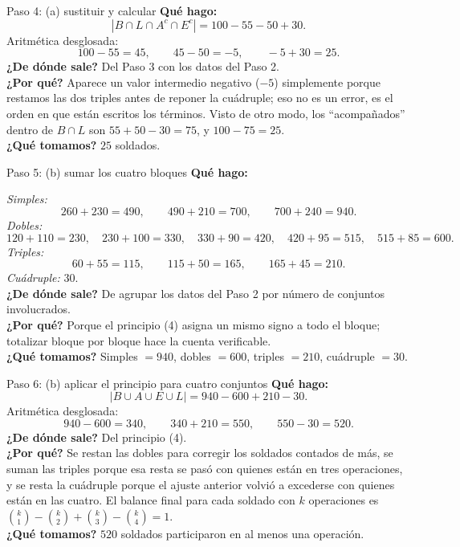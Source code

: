 \documentclass[11pt]{article}
\begin{document}
\begin{sol}
\begin{paso}{Paso 4: (a) sustituir y calcular}
\textbf{Qu\'e hago:}
\[
|B\cap L\cap A^{c}\cap E^{c}| = 100 - 55 - 50 + 30 .
\]
Aritm\'etica desglosada:
\[
100 - 55 = 45,\qquad 45 - 50 = -5,\qquad -5 + 30 = 25 .
\]
\textbf{¿De d\'onde sale?} Del Paso 3 con los datos del Paso 2.\\
\textbf{¿Por qu\'e?} Aparece un valor intermedio negativo ($-5$) simplemente porque restamos las dos triples antes de reponer la cu\'adruple; eso no es un error, es el orden en que est\'an escritos los t\'erminos. Visto de otro modo, los ``acompa\~nados'' dentro de $B\cap L$ son $55+50-30 = 75$, y $100-75 = 25$.\\
\textbf{¿Qu\'e tomamos?} $25$ soldados.
\end{paso}

\begin{paso}{Paso 5: (b) sumar los cuatro bloques}
\textbf{Qu\'e hago:}

\emph{Simples:}
\[
260+230 = 490,\qquad 490+210 = 700,\qquad 700+240 = 940 .
\]
\emph{Dobles:}
\[
120+110 = 230,\quad 230+100 = 330,\quad 330+90 = 420,\quad 420+95 = 515,\quad 515+85 = 600 .
\]
\emph{Triples:}
\[
60+55 = 115,\qquad 115+50 = 165,\qquad 165+45 = 210 .
\]
\emph{Cu\'adruple:} $30$.\\
\textbf{¿De d\'onde sale?} De agrupar los datos del Paso 2 por n\'umero de conjuntos involucrados.\\
\textbf{¿Por qu\'e?} Porque el principio (4) asigna un mismo signo a todo el bloque; totalizar bloque por bloque hace la cuenta verificable.\\
\textbf{¿Qu\'e tomamos?} Simples $=940$, dobles $=600$, triples $=210$, cu\'adruple $=30$.
\end{paso}

\begin{paso}{Paso 6: (b) aplicar el principio para cuatro conjuntos}
\textbf{Qu\'e hago:}
\[
|B\cup A\cup E\cup L| = 940 - 600 + 210 - 30 .
\]
Aritm\'etica desglosada:
\[
940 - 600 = 340,\qquad 340 + 210 = 550,\qquad 550 - 30 = 520 .
\]
\textbf{¿De d\'onde sale?} Del principio (4).\\
\textbf{¿Por qu\'e?} Se restan las dobles para corregir los soldados contados de m\'as, se suman las triples porque esa resta se pas\'o con quienes est\'an en tres operaciones, y se resta la cu\'adruple porque el ajuste anterior volvi\'o a excederse con quienes est\'an en las cuatro. El balance final para cada soldado con $k$ operaciones es $\binom{k}{1}-\binom{k}{2}+\binom{k}{3}-\binom{k}{4}=1$.\\
\textbf{¿Qu\'e tomamos?} $520$ soldados participaron en al menos una operaci\'on.
\end{paso}


\end{sol}
\end{document}
